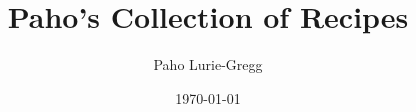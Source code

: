 \documentclass[letterpaper,12pt]{article}
\begin{document}
\title{Paho's Collection of Recipes}
\date{\today}

\author{Paho Lurie-Gregg}





\end{document}

